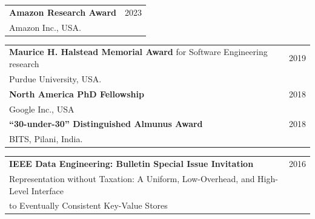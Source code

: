 \documentclass{article}
\begin{document}
\begin{center}
\begin{tabular}{ p{15cm}  r }
%
{\bf Amazon Research Award\footnotemark} & 2023 \\ [3pt]
\hspace{2em} Amazon Inc., USA. &
\\[6pt]
%
  \end{tabular}

  \begin{tabular}{ p{15cm}  r }
{\bf Maurice H. Halstead Memorial Award} for Software
Engineering research & 2019 \\ [3pt]
\hspace{2em} Purdue University, USA. &
\\[6pt]
%
{\bf North America PhD Fellowship}& 2018 \\ [3pt]
\hspace{2em} Google Inc., USA &
\\[6pt]
%
{\bf ``30-under-30'' Distinguished Almunus Award} & 2018\\ [3pt]
    \hspace{2em} BITS, Pilani, India. & \\[6pt]
   \end{tabular}
\end{center}

\begin{center}
  \begin{tabular}{ p{15cm}  r }
    {\bf IEEE Data Engineering: Bulletin Special Issue Invitation} & 2016\\ [3pt]
    \hspace{2em} Representation without Taxation: A Uniform, Low-Overhead,
    and High-Level Interface & \\
    \hspace{2em} to Eventually Consistent Key-Value Stores   & \\[6pt]
    \end{tabular}
\end{center}
\end{document}
